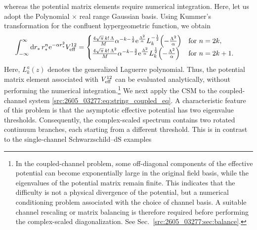 whereas the potential matrix elements require numerical integration.
Here, let us adopt the Polynomial $\times$ real range Gaussian basis.
Using Kummer's transformation for the confluent hypergeometric function, we
obtain
\begin{align}
    \int_{-\infty}^\infty \mathrm{d} r_*\, r_*^n \mathrm{e}^{-\alpha r_*^2} V_{\mathrm{eff}}^{12}
   &= 
\begin{cases}
\frac{
4\sqrt{\pi}\,k!\,\Lambda
}{
M
}
\alpha^{-k-\frac{1}{2}}
\mathrm{e}^{\frac{\Lambda^2}{\alpha}}
L_k^{-\frac{1}{2}}
\!\left(
-\frac{\Lambda^2}{\alpha}
\right) & \text{for $n=2k$} ,
\\
\frac{
4\sqrt{\pi}\,k!\,\Lambda^2
}{
M
}
\alpha^{-k-\frac{3}{2}}
\mathrm{e}^{\frac{\Lambda^2}{\alpha}}
L_k^{\frac{1}{2}}
\!\left(
-\frac{\Lambda^2}{\alpha}
\right) & \text{for $n=2k+1$} .
\end{cases}
  \label{src:2605_03277:eq:kummer_transf}
\end{align}
Here, $L_k^a(z)$ denotes the generalized Laguerre polynomial.
Thus, the potential matrix element associated with $V_{\mathrm{eff}}^{12}$ can
be evaluated analytically, without performing the numerical integration.\footnote{%
In the coupled-channel problem, some off-diagonal components of the effective
potential can become exponentially large in the original field basis, while
the eigenvalues of the potential matrix remain finite.
This indicates that the difficulty is not a physical divergence of the
potential, but a numerical conditioning problem associated with the choice of
channel basis.
A suitable channel rescaling or matrix balancing is therefore required before
performing the complex-scaled diagonalization. See Sec.~\ref{src:2605_03277:sec:balance}.}
We next apply the CSM to the coupled-channel system
\eqref{src:2605_03277:eq:string_coupled_eq}.
A characteristic feature of this problem is that the asymptotic effective
potential has two eigenvalue thresholds.
Consequently, the complex-scaled spectrum contains two rotated continuum
branches, each starting from a different threshold.
This is in contrast to the single-channel Schwarzschild--dS examples
